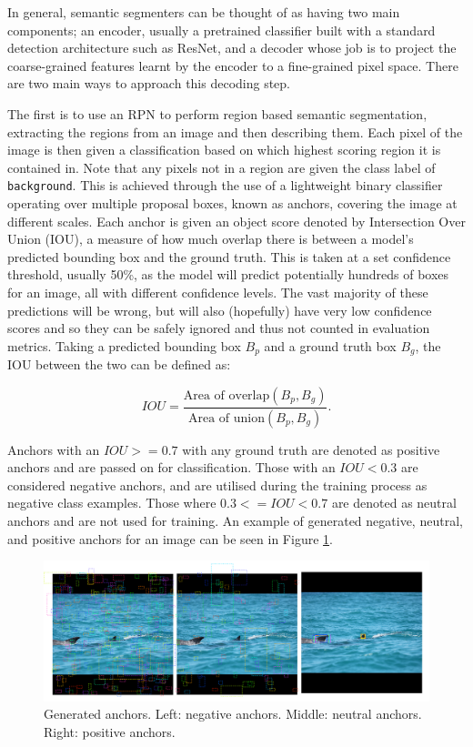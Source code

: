 In general, semantic segmenters can be thought of as having two main components; an encoder, usually a pretrained classifier built with a standard detection architecture such as ResNet, and a decoder whose job is to project the coarse-grained features learnt by the encoder to a fine-grained pixel space. There are two main ways to approach this decoding step.

The first is to use an RPN to perform region based semantic segmentation, extracting the regions from an image and then describing them. Each pixel of the image is then given a classification based on which highest scoring region it is contained in. Note that any pixels not in a region are given the class label of \texttt{background}. This is achieved through the use of a lightweight binary classifier operating over multiple proposal boxes, known as anchors, covering the image at different scales. Each anchor is given an object score denoted by Intersection Over Union (IOU), a measure of how much overlap there is between a model's predicted bounding box and the ground truth. This is taken at a set confidence threshold, usually 50\%, as the model will predict potentially hundreds of boxes for an image, all with different confidence levels. The vast majority of these predictions will be wrong, but will also (hopefully) have very low confidence scores and so they can be safely ignored and thus not counted in evaluation metrics. Taking a predicted bounding box $B_p$ and a ground truth box $B_g$, the IOU between the two can be defined as:

\begin{equation}
IOU = \frac{\text{Area of overlap}(B_p, B_g)}{\text{Area of union}(B_p, B_g)}.
\end{equation}

Anchors with an $IOU >= 0.7$ with any ground truth are denoted as positive anchors and are passed on for classification. Those with an $IOU < 0.3$ are considered negative anchors, and are utilised during the training process as negative class examples. Those where $0.3 <= IOU < 0.7$ are denoted as neutral anchors and are not used for training. An example of generated negative, neutral, and positive anchors for an image can be seen in Figure \ref{fig:anchor-types}.

\begin{figure}
	\begin{center}
		\includegraphics[scale=0.25]{Chapter2/figs/anchor-types.png}
	\end{center}
	\caption[Generated anchors.]{Generated anchors. Left: negative anchors. Middle: neutral anchors. Right: positive anchors.}
	\label{fig:anchor-types}
\end{figure}

